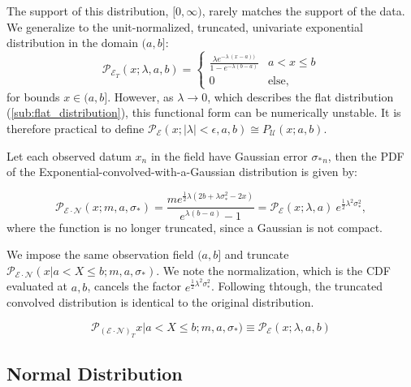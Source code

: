 \documentclass[twocolumn]{aastex631}
\newcommand{\mcal}[1]{\mathcal{#1}}
\newcommand{\Exp}[1]{e^{#1}}
\newcommand{\pdf}{\mcal{P}}
\newcommand{\sigobs}{{\sigma_*}}
\begin{document}
        The support of this distribution, $[0, \infty)$, rarely matches the support of the data. We generalize to the unit-normalized, truncated, univariate exponential distribution in the domain $(a, b]$:
        \begin{equation} \label{eq:pdf_truncexp_univariate}
            \pdf_{\mcal{E}_T}(x; \lambda, a, b) = \begin{cases}
                \frac{\lambda \Exp{-\lambda \, (x - a))}}{1 - \Exp{-\lambda(b - a)}} & a < x \leq b \\
                0 & \text{else},
            \end{cases}
        \end{equation}
        for bounds $x \in (a,b]$. However, as $\lambda \rightarrow 0$, which describes the flat distribution (\autoref{sub:flat_distribution}), this functional form can be numerically unstable. It is therefore practical to define $\pdf_{\mcal{E}}(x; |\lambda| < \epsilon, a, b) \cong P_{\mcal{U}}(x; a,b)$.

        Let each observed datum $x_n$ in the field have Gaussian error $\sigobs_n$,
        then the PDF of the Exponential-convolved-with-a-Gaussian distribution is given by:

        \begin{equation}
            \pdf_{\mcal{E}\cdot\mcal{N}}(x;m,a,\sigma_*) = \frac{m  e^{\frac{1}{2} \lambda  \left(2 b+\lambda  \sigma _*^2-2 x\right)}}{e^{\lambda  (b-a)}-1} = \pdf_{\mcal{E}}(x;\lambda,a) \ \Exp{\frac{1}{2}\lambda^2 \sigma_*^2},
        \end{equation}
        where the function is no longer truncated, since a Gaussian is not compact.

        We impose the same observation field $(a, b]$ and truncate $\pdf_{\mcal{E}\cdot\mcal{N}}(x | a < X \leq b;m,a,\sigma_*)$.
        We note the normalization, which is the CDF evaluated at $a, b$, cancels the factor
        $\Exp{\frac{1}{2}\lambda^2 \sigma_*^2}$. Following thtough, the truncated convolved distribution is identical to the original distribution.

        \begin{equation}
            \pdf_{(\mcal{E}\cdot\mcal{N})_T}x | a < X \leq b;m,a,\sigma_*) \equiv \pdf_{\mcal{E}}(x; \lambda, a, b)
        \end{equation}

    \vspace{10pt}
    \subsection{Normal Distribution} \label{app:sub:normal_distribution}
\end{document}
